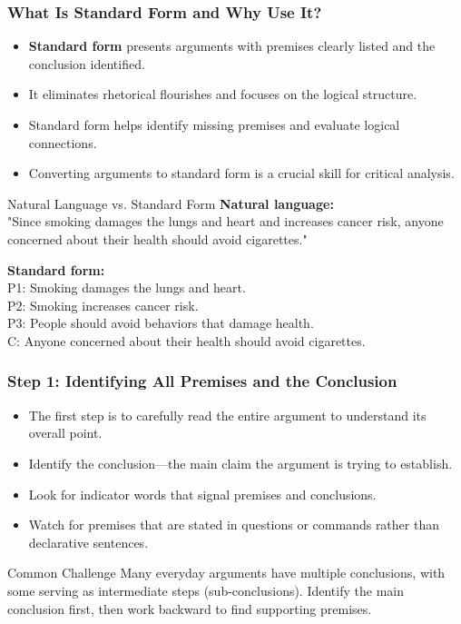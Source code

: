 \documentclass{beamer}
\begin{document}
\begin{frame}
    \frametitle{What Is Standard Form and Why Use It?}
    \begin{itemize}
        \item \textbf{Standard form} presents arguments with premises clearly listed and the conclusion identified.
        \item It eliminates rhetorical flourishes and focuses on the logical structure.
        \item Standard form helps identify missing premises and evaluate logical connections.
        \item Converting arguments to standard form is a crucial skill for critical analysis.
    \end{itemize}
    
    \begin{exampleblock}{Natural Language vs. Standard Form}
        \textbf{Natural language:}\\
        "Since smoking damages the lungs and heart and increases cancer risk, anyone concerned about their health should avoid cigarettes."
        
        \textbf{Standard form:}\\
        P1: Smoking damages the lungs and heart.\\
        P2: Smoking increases cancer risk.\\
        P3: People should avoid behaviors that damage health.\\
        C: Anyone concerned about their health should avoid cigarettes.
    \end{exampleblock}
\end{frame}

\begin{frame}
    \frametitle{Step 1: Identifying All Premises and the Conclusion}
    \begin{itemize}
        \item The first step is to carefully read the entire argument to understand its overall point.
        \item Identify the conclusion—the main claim the argument is trying to establish.
        \item Look for indicator words that signal premises and conclusions.
        \item Watch for premises that are stated in questions or commands rather than declarative sentences.
    \end{itemize}
    
    \begin{alertblock}{Common Challenge}
        Many everyday arguments have multiple conclusions, with some serving as intermediate steps (sub-conclusions). Identify the main conclusion first, then work backward to find supporting premises.
    \end{alertblock}
\end{frame}
\end{document}
